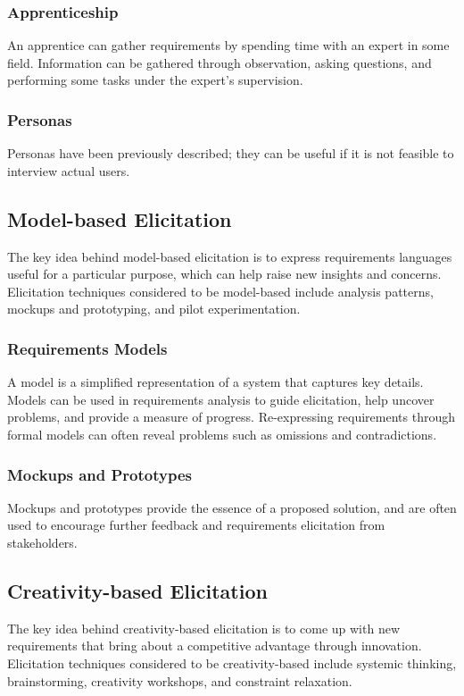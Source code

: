 \documentclass[12pt,titlepage]{article}
\begin{document}
      \subsubsection{Apprenticeship}
        An apprentice can gather requirements by spending time with an expert in some field. Information can be gathered through observation, asking questions, and
        performing some tasks under the expert's supervision.

      \subsubsection{Personas}
        Personas have been previously described; they can be useful if it is not feasible to interview actual users.

    \subsection{Model-based Elicitation}
      The key idea behind model-based elicitation is to express requirements languages useful for a particular purpose, which can help raise new insights and concerns.
      Elicitation techniques considered to be model-based include analysis patterns, mockups and prototyping, and pilot experimentation.

      \subsubsection{Requirements Models}
        A model is a simplified representation of a system that captures key details. Models can be used in requirements analysis to guide elicitation, help uncover
        problems, and provide a measure of progress. Re-expressing requirements through formal models can often reveal problems such as omissions and contradictions.

      \subsubsection{Mockups and Prototypes}
        Mockups and prototypes provide the essence of a proposed solution, and are often used to encourage further feedback and requirements elicitation from stakeholders.

    \subsection{Creativity-based Elicitation}
      The key idea behind creativity-based elicitation is to come up with new requirements that bring about a competitive advantage through innovation. Elicitation techniques
      considered to be creativity-based include systemic thinking, brainstorming, creativity workshops, and constraint relaxation.
\end{document}
